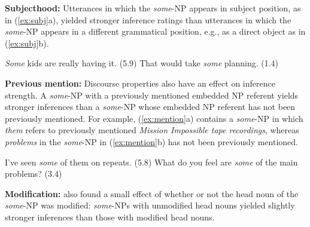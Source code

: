 \documentclass[11pt,a4paper]{article}
\begin{document}
\noindent\textbf{Subjecthood:}
Utterances in which the \emph{some}-NP appears in subject position, as in (\ref{ex:subj}a), yielded stronger inference ratings than utterances in which the \emph{some}-NP appears in a different grammatical position, e.g., as a direct object as in  (\ref{ex:subj}b).
\vspace{-.2em}
\begin{exe}
\small
    \ex \label{ex:subj} 
    \begin{xlist}
    \ex \emph{Some} kids are really having it. \hfill (5.9)
    \ex That would take \emph{some} planning. \hfill (1.4)
    \end{xlist}
\end{exe}
\vspace{-.4em}
\noindent\textbf{Previous mention:}
Discourse properties also have an effect on inference strength. A \emph{some}-NP with a previously mentioned embedded NP referent yields stronger inferences than a \emph{some}-NP whose embedded NP referent has not been previously mentioned. For example, (\ref{ex:mention}a) contains a \emph{some}-NP in which \emph{them} refers to previously mentioned \emph{Mission Impossible tape recordings}, whereas \emph{problems} in the \emph{some}-NP in (\ref{ex:mention}b) has not been previously mentioned.
\vspace{-.2em}
\begin{exe}
\small
    \ex \label{ex:mention}\begin{xlist}
    \ex  I've seen \emph{some} of them on repeats. \hfill (5.8)
    \ex  What do you feel  are \emph{some} of the main problems? \hfill (3.4)  
    \end{xlist}
\end{exe}
\vspace{-.4em}

\noindent\textbf{Modification:} \citet{degen2015investigating} also found a small effect of whether or not the head noun of the \emph{some}-NP was modified: \emph{some}-NPs with unmodified head nouns yielded slightly stronger inferences than those with modified head nouns.
\end{document}
